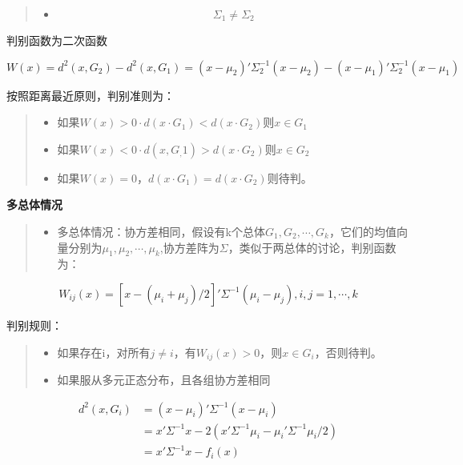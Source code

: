 \documentclass[]{ctexbook}
\providecommand{\tightlist}{%
  \setlength{\itemsep}{0pt}\setlength{\parskip}{0pt}}
\begin{document}
\begin{quote}
\begin{itemize}
\tightlist
\item
  \[\Sigma_1 \neq \Sigma_2\]
\end{itemize}
\end{quote}

判别函数为二次函数

\[W(x)=d^2(x,G_2)-d^2(x,G_1)=(x-\mu_2)'\Sigma_2^{-1}(x-\mu_2)-(x-\mu_1)'\Sigma_2^{-1}(x-\mu_1)\]

按照距离最近原则，判别准则为：

\begin{quote}
\begin{itemize}
\tightlist
\item
  如果\(W(x)>0\cdot d(x\cdot G_1) < d(x\cdot G_2)\)则\(x\in G_1\)
\item
  如果\(W(x)<0\cdot d(x,G_,1) > d(x\cdot G_2)\)则\(x\in G_2\)
\item
  如果\(W(x)=0，d(x\cdot G_1) = d(x\cdot G_2)\)则待判。
\end{itemize}
\end{quote}

\textbf{多总体情况}

\begin{quote}
\begin{itemize}
\tightlist
\item
  多总体情况：协方差相同，假设有k个总体\(G_1,G_2,\cdots,G_k\)，它们的均值向量分别为\(\mu_1,\mu_2,\cdots,\mu_k\),协方差阵为\(\Sigma\)，类似于两总体的讨论，判别函数为：
\end{itemize}
\end{quote}

\[W_{ij}(x)=[x-(\mu_i+\mu_j)/2]'\Sigma^{-1}(\mu_i-\mu_j),i,j=1,\cdots,k\]

判别规则：

\begin{quote}
\begin{itemize}
\tightlist
\item
  如果存在i，对所有\(j\neq i\)，有\(W_{ij}(x)>0\)，则\(x\in G_i\)，否则待判。
\item
  如果服从多元正态分布，且各组协方差相同
\end{itemize}
\end{quote}

\[\begin{aligned} d^2(x,G_i)& =(x-\mu_i)'\Sigma^{-1}(x-\mu_i) \\ & =x'\Sigma^{-1}x-2(x'\Sigma^{-1}\mu_i-\mu_i'\Sigma^{-1}\mu_i/2) \\ & =x'\Sigma^{-1}x-f_i(x)\end{aligned}\]
\end{document}
